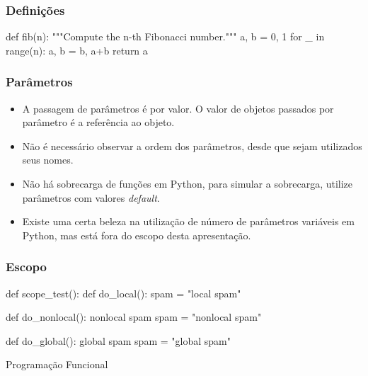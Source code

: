 \documentclass[aspectratio=169,14pt]{beamer}
\begin{document}
\begin{frame}[fragile]
    \frametitle{Definições}
    \begin{python}
        def fib(n):
             """Compute the n-th Fibonacci number."""
             a, b = 0, 1
             for _ in range(n):
                 a, b = b, a+b
             return a
    \end{python}
\end{frame}

\begin{frame}
    \frametitle{Parâmetros}
    \begin{itemize}
        \item A passagem de parâmetros é por valor. O valor de
        objetos passados por parâmetro é a referência ao objeto.
        \item Não é necessário observar a ordem dos parâmetros,
        desde que sejam utilizados seus nomes.
        \item Não há sobrecarga de funções em Python, para simular
        a sobrecarga, utilize parâmetros com valores \textit{default}.
        \item Existe uma certa beleza na utilização de número de
        parâmetros variáveis em Python, mas está fora do escopo desta
        apresentação.
    \end{itemize}
\end{frame}

\begin{frame}[fragile]
    \frametitle{Escopo}
    \begin{python}
        def scope_test():
            def do_local():
                spam = "local spam"

            def do_nonlocal():
                nonlocal spam
                spam = "nonlocal spam"

            def do_global():
                global spam
                spam = "global spam"
    \end{python}
\end{frame}

\begin{frame}
    \begin{center}
        \Huge Programação Funcional
    \end{center}
\end{frame}
\end{document}
